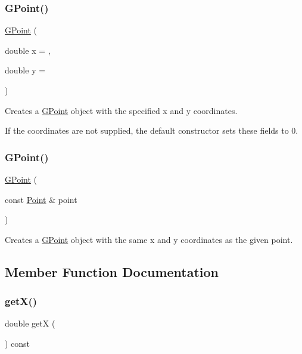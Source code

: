 \subsubsection{\texorpdfstring{G\+Point()}{GPoint()}\hspace{0.1cm}{\footnotesize\ttfamily [1/2]}}
{\footnotesize\ttfamily \mbox{\hyperlink{classGPoint}{G\+Point}} (\begin{DoxyParamCaption}\item[{double}]{x = {},  }\item[{double}]{y = {} }\end{DoxyParamCaption})}



Creates a {\ttfamily \mbox{\hyperlink{classGPoint}{G\+Point}}} object with the specified {\ttfamily x} and {\ttfamily y} coordinates. 

If the coordinates are not supplied, the default constructor sets these fields to 0. \mbox{\label{classGPoint_add4732bf649d02caab4d24487e0f5caa}} 
\subsubsection{\texorpdfstring{G\+Point()}{GPoint()}\hspace{0.1cm}{\footnotesize\ttfamily [2/2]}}
{\footnotesize\ttfamily \mbox{\hyperlink{classGPoint}{G\+Point}} (\begin{DoxyParamCaption}\item[{const \mbox{\hyperlink{classPoint}{Point}} \&}]{point }\end{DoxyParamCaption})}



Creates a {\ttfamily \mbox{\hyperlink{classGPoint}{G\+Point}}} object with the same {\ttfamily x} and {\ttfamily y} coordinates as the given point. 



\subsection{Member Function Documentation}
\mbox{\label{classGPoint_a344385751bee0720059403940d57a13e}} 
\subsubsection{\texorpdfstring{get\+X()}{getX()}}
{\footnotesize\ttfamily double getX (\begin{DoxyParamCaption}{ }\end{DoxyParamCaption}) const}



